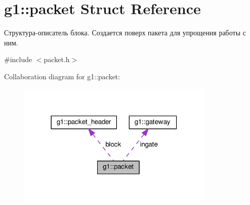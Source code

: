 \hypertarget{structg1_1_1packet}{}\section{g1\+:\+:packet Struct Reference}
\label{structg1_1_1packet}


Структура-\/описатель блока. Создается поверх пакета для упрощения работы с ним.  




{\ttfamily \#include $<$packet.\+h$>$}



Collaboration diagram for g1\+:\+:packet\+:
\nopagebreak
\begin{figure}[H]
\begin{center}
\leavevmode
\includegraphics[width=266pt]{structg1_1_1packet__coll__graph}
\end{center}
\end{figure}
